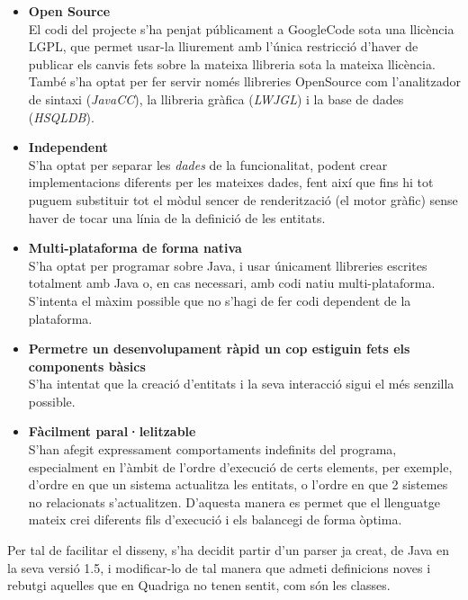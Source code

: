   \begin{itemize}
    \item {\bf Open Source} \hfill \\
      El codi del projecte s'ha penjat públicament a GoogleCode sota una llicència LGPL, que permet usar-la lliurement amb l'única restricció d'haver de publicar els canvis fets sobre la mateixa llibreria sota la mateixa llicència. També s'ha optat per fer servir només llibreries OpenSource com l'analitzador de sintaxi ({\em JavaCC}), la llibreria gràfica ({\em LWJGL}) i la base de dades ({\em HSQLDB}).
      
    \item {\bf Independent} \hfill \\
      S'ha optat per separar les {\em dades} de la funcionalitat, podent crear implementacions diferents per les mateixes dades, fent així que fins hi tot puguem substituir tot el mòdul sencer de renderització (el motor gràfic) sense haver de tocar una línia de la definició de les entitats.
      
    \item {\bf Multi-plataforma de forma nativa} \hfill \\
      S'ha optat per programar sobre Java, i usar únicament llibreries escrites totalment amb Java o, en cas necessari, amb codi natiu multi-plataforma. S'intenta el màxim possible que no s'hagi de fer codi dependent de la plataforma.
      
    \item {\bf Permetre un desenvolupament ràpid un cop estiguin fets els components bàsics} \hfill \\
      S'ha intentat que la creació d'entitats i la seva interacció sigui el més senzilla possible.
      
    \item {\bf Fàcilment paral·lelitzable} \hfill \\
      S'han afegit expressament comportaments indefinits del programa, especialment en l'àmbit de l'ordre d'execució de certs elements, per exemple, d'ordre en que un sistema actualitza les entitats, o l'ordre en que 2 sistemes no relacionats s'actualitzen. D'aquesta manera es permet que el llenguatge mateix crei diferents fils d'execució i els balancegi de forma òptima.
  \end{itemize}

  Per tal de facilitar el disseny, s'ha decidit partir d'un parser ja creat, de Java en la seva versió 1.5, i modificar-lo de tal manera que admeti definicions noves i rebutgi aquelles que en Quadriga no tenen sentit, com són les classes.
  
